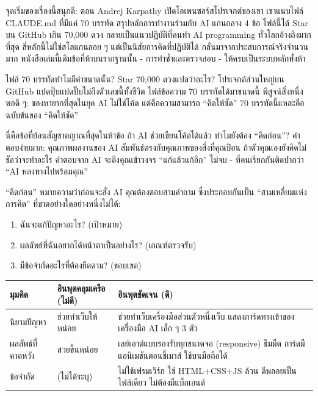 

จุดเริ่มของเรื่องนี้สนุกดี: ตอน Andrej Karpathy เปิดโอเพนซอร์สโปรเจกต์ของเขา เขาแนบไฟล์ CLAUDE.md ที่มีแค่ 70 บรรทัด สรุปหลักการทำงานร่วมกับ AI แกนกลาง 4 ข้อ ไฟล์นี้ได้ Star บน GitHub เกิน 70,000 ดวง กลายเป็นแนวปฏิบัติที่คนทำ AI programming ทั่วโลกอ้างถึงมากที่สุด สี่หลักนี้ไม่ใช่สโลแกนลอย ๆ แต่เป็นนิสัยการคิดที่ปฏิบัติได้ กลั่นมาจากประสบการณ์จริงจำนวนมาก หนังสือเล่มนี้เติมข้อที่ห้าบนรากฐานนั้น - การทำซ้ำและตรวจสอบ - ให้ครบเป็นระบบหลักทั้งห้า

\begin{tcbinfo}{ไฟล์ 70 บรรทัดทำไมมีค่าขนาดนั้น?}
Star 70,000 ดวงแปลว่าอะไร? โปรเจกต์ส่วนใหญ่บน GitHub แปดปุ๊บแปดปั๊บไม่ถึงตัวเลขนี้ทั้งชีวิต ไฟล์ข้อความ 70 บรรทัดได้มาขนาดนี้ พิสูจน์สิ่งหนึ่งพอดี ๆ: ของหายากที่สุดในยุค AI ไม่ใช่โค้ด แต่คือความสามารถ “คิดให้ชัด” 70 บรรทัดนี้แหละคือฉบับข้นของ “คิดให้ชัด”

\end{tcbinfo}


นี่คือข้อที่ย้อนสัญชาตญาณที่สุดในห้าข้อ ถ้า AI ช่วยเขียนโค้ดได้แล้ว ทำไมยังต้อง “คิดก่อน”? คำตอบง่ายมาก: คุณภาพผลงานของ AI สัมพันธ์ตรงกับคุณภาพของสิ่งที่คุณป้อน ถ้าตัวคุณเองยังคิดไม่ชัดว่าจะทำอะไร คำตอบจาก AI จะดึงคุณเข้าวงจร “แก้แล้วแก้อีก” ไม่จบ - ที่คนเรียกกันติดปากว่า “AI หลงทางไปพร้อมคุณ”

“คิดก่อน” หมายความว่าก่อนจะสั่ง AI คุณต้องตอบสามคำถาม ซึ่งประกอบกันเป็น “สามเหลี่ยมแห่งการคิด” ที่ขาดอย่างใดอย่างหนึ่งไม่ได้:

\begin{enumerate}
  \item ฉันจะแก้ปัญหาอะไร? (เป้าหมาย)
  \item ผลลัพธ์ที่ฉันอยากได้หน้าตาเป็นอย่างไร? (เกณฑ์ตรวจรับ)
  \item มีข้อจำกัดอะไรที่ต้องยึดตาม? (ขอบเขต)
\end{enumerate}

\begin{center}
\begin{tabularx}{\linewidth}{|X|X|X|}
\hline
\textbf{มุมคิด} & \textbf{อินพุตคลุมเครือ (ไม่ดี)} & \textbf{อินพุตชัดเจน (ดี)} \tabularnewline
\hline
นิยามปัญหา & ช่วยทำเว็บให้หน่อย & ช่วยทำเว็บเครื่องมือส่วนตัวหนึ่งเว็บ แสดงการ์ดทางเข้าของเครื่องมือ AI เล็ก ๆ 3 ตัว \tabularnewline
ผลลัพธ์ที่คาดหวัง & สวยขึ้นหน่อย & เลย์เอาต์แบบรองรับทุกขนาดจอ (responsive) ธีมมืด การ์ดมีแอนิเมชันตอนชี้เมาส์ ใช้บนมือถือได้ \tabularnewline
ข้อจำกัด & (ไม่ได้ระบุ) & ไม่ใช้เฟรมเวิร์ก ใช้ HTML+CSS+JS ล้วน ดีพลอยเป็นไฟล์เดียว ไม่ต้องมีแบ็กเอนด์ \tabularnewline
\hline
\end{tabularx}
\end{center}

